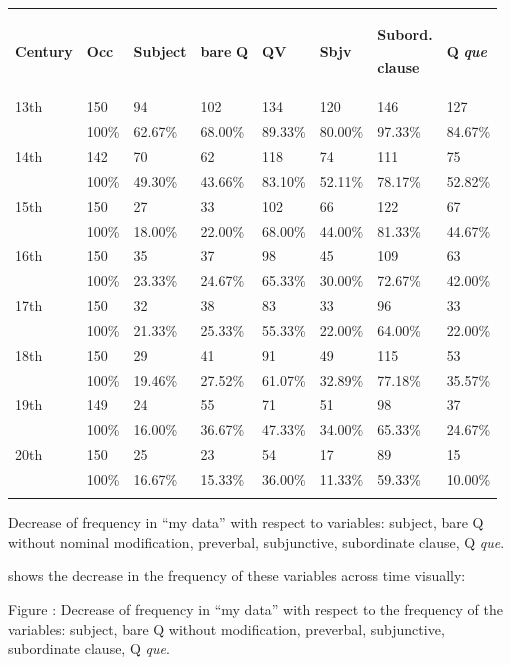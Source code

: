 \begin{table}
\begin{tabularx}{\textwidth}{XXXXXXXX}
\lsptoprule
 \textbf{Century} & \textbf{Occ} & \textbf{Subject} & \textbf{bare} \textbf{Q} & \textbf{QV} & \textbf{Sbjv} & { \textbf{Subord.}}

 \textbf{clause} & \textbf{Q} \textbf{\textit{que}}\\
 13th & 150 & 94 & 102 & 134 & 120 & 146 & 127\\
& 100\% & 62.67\% & 68.00\% & 89.33\% & 80.00\% & 97.33\% & 84.67\%\\
 14th & 142 & 70 & 62 & 118 & 74 & 111 & 75\\
& 100\% & 49.30\% & 43.66\% & 83.10\% & 52.11\% & 78.17\% & 52.82\%\\
 15th & 150 & 27 & 33 & 102 & 66 & 122 & 67\\
& 100\% & 18.00\% & 22.00\% & 68.00\% & 44.00\% & 81.33\% & 44.67\%\\
 16th & 150 & 35 & 37 & 98 & 45 & 109 & 63\\
& 100\% & 23.33\% & 24.67\% & 65.33\% & 30.00\% & 72.67\% & 42.00\%\\
 17th & 150 & 32 & 38 & 83 & 33 & 96 & 33\\
& 100\% & 21.33\% & 25.33\% & 55.33\% & 22.00\% & 64.00\% & 22.00\%\\
 18th & 150 & 29 & 41 & 91 & 49 & 115 & 53\\
& 100\% & 19.46\% & 27.52\% & 61.07\% & 32.89\% & 77.18\% & 35.57\%\\
 19th & 149 & 24 & 55 & 71 & 51 & 98 & 37\\
& 100\% & 16.00\% & 36.67\% & 47.33\% & 34.00\% & 65.33\% & 24.67\%\\
 20th & 150 & 25 & 23 & 54 & 17 & 89 & 15\\
& 100\% & 16.67\% & 15.33\% & 36.00\% & 11.33\% & 59.33\% & 10.00\%\\
\lspbottomrule
\end{tabularx}
\caption{\label{tab:} ~}Decrease of frequency in “my data” with respect to variables: subject, bare Q without nominal modification, preverbal, subjunctive, subordinate clause, Q \textit{que}.
\end{table}

 shows the decrease in the frequency of these variables across time visually:

Figure : Decrease of frequency in “my data” with respect to the frequency of the variables: subject, bare Q without modification, preverbal, subjunctive, subordinate clause, Q \textit{que}.

